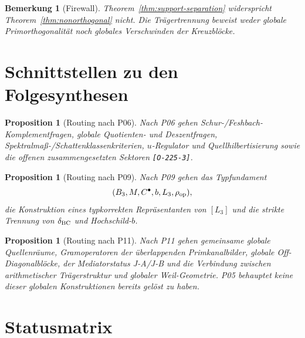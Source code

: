 \documentclass[11pt,a4paper]{amsart}
\newtheorem{proposition}[theorem]{Proposition}
\newtheorem{remark}[theorem]{Bemerkung}
\begin{document}
\begin{remark}[Firewall]
Theorem~\ref{thm:support-separation} widerspricht
Theorem~\ref{thm:nonorthogonal} nicht. Die Trägertrennung beweist weder
globale Primorthogonalität noch globales Verschwinden der Kreuzblöcke.
\end{remark}

\section{Schnittstellen zu den Folgesynthesen}

\begin{proposition}[Routing nach P06]
Nach P06 gehen Schur-/Feshbach-Komplementfragen, globale Quotienten- und
Deszentfragen, Spektralmaß-/Schattenklassenkriterien, $u$-Regulator und
Quellhilbertisierung sowie die offenen zusammengesetzten Sektoren
\texttt{[O-225-3]}.
\end{proposition}

\begin{proposition}[Routing nach P09]
Nach P09 gehen das Typfundament
\[
(B_3,M,C^\bullet,b,L_3,\rho_{\rm op}),
\]
die Konstruktion eines typkorrekten Repräsentanten von $[L_3]$ und die
strikte Trennung von $\delta_{\rm BC}$ und Hochschild-$b$.
\end{proposition}

\begin{proposition}[Routing nach P11]
Nach P11 gehen gemeinsame globale Quellenräume, Gramoperatoren der
überlappenden Primkanalbilder, globale Off-Diagonalblöcke, der Mediatorstatus
J-A/J-B und die Verbindung zwischen arithmetischer Trägerstruktur und globaler
Weil-Geometrie. P05 behauptet keine dieser globalen Konstruktionen bereits
gelöst zu haben.
\end{proposition}

\section{Statusmatrix}
\end{document}
